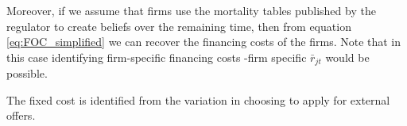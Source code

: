 \documentclass[12pt]{article}
\theoremstyle{plain}
\theoremstyle{plain}
\begin{document}
Moreover, if we assume that firms use the mortality tables published by the regulator to create beliefs over the remaining time, then from equation \ref{eq:FOC_simplified} we can recover the financing costs of the firms. Note that in this case identifying firm-specific financing costs -firm specific $\bar{r}_{jt}$ would be possible. 

The fixed cost is identified from the variation in choosing to apply for external offers. 


 
\end{document}
